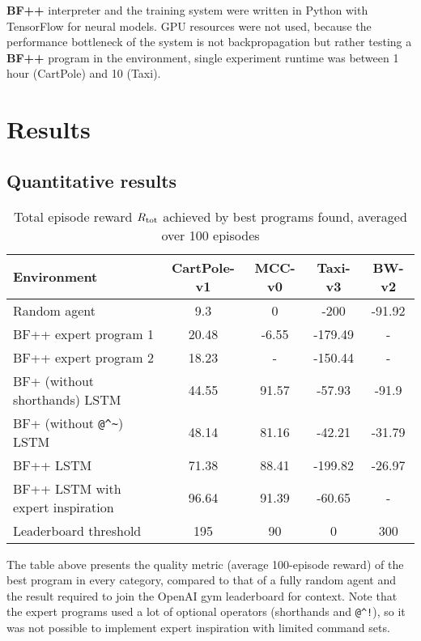 \textbf{BF++} interpreter and the training system were written in Python with TensorFlow for neural models.
GPU resources were not used, because the performance bottleneck of the system is not backpropagation but rather testing a \textbf{BF++} program in the environment, single experiment runtime was between 1 hour (CartPole) and 10 (Taxi).

\newpage
\section{Results}

\subsection{Quantitative results}

\begin{table}[H]
  \caption{Total episode reward $R_\text{tot}$ achieved by best programs found, averaged over 100 episodes}
  \label{tab:quality}
  \centering
  \begin{tabular}{lcccc}
    Environment     & CartPole-v1     & MCC-v0 & Taxi-v3 & BW-v2 \\
    \midrule
    Random agent & 9.3 & 0 & -200 & -91.92  \\
    \midrule
    BF++ expert program 1 & 20.48 & -6.55 & -179.49 & - \\
    BF++ expert program 2 & 18.23 & - & -150.44 & - \\
    BF+ (without shorthands) LSTM & 44.55 & 91.57 & -57.93 & -91.9 \\
    BF+ (without \verb|@^~|) LSTM & 48.14 & 81.16 & -42.21 & -31.79 \\
    BF++ LSTM     & 71.38 & 88.41 & -199.82 & -26.97 \\
    BF++ LSTM with expert inspiration  & 96.64 & 91.39 & -60.65 & - \\
    \midrule
    Leaderboard threshold & 195 & 90 & 0 & 300 \\
    \bottomrule
  \end{tabular}
\end{table}

The table above presents the quality metric (average 100-episode reward) of the best program in every category, compared to that of a fully random agent and the result required to join the OpenAI gym leaderboard for context.
Note that the expert programs used a lot of optional operators (shorthands and \verb|@^!|), so it was not possible to implement expert inspiration with limited command sets.

